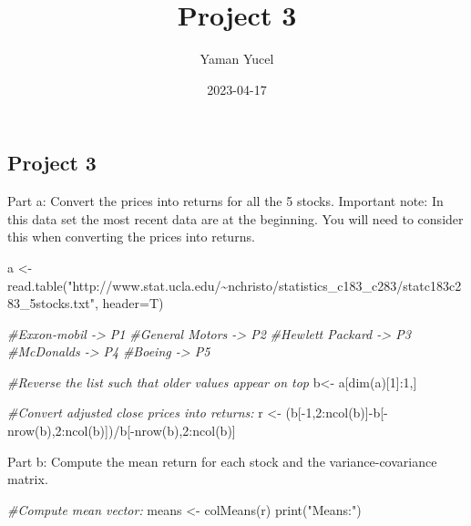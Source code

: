 \documentclass[
]{article}
\title{Project 3}
\author{Yaman Yucel}
\date{2023-04-17}
\newenvironment{Shaded}{\begin{snugshade}}{\end{snugshade}}
\newcommand{\AttributeTok}[1]{\textcolor[rgb]{0.77,0.63,0.00}{#1}}
\newcommand{\CommentTok}[1]{\textcolor[rgb]{0.56,0.35,0.01}{\textit{#1}}}
\newcommand{\DecValTok}[1]{\textcolor[rgb]{0.00,0.00,0.81}{#1}}
\newcommand{\FunctionTok}[1]{\textcolor[rgb]{0.00,0.00,0.00}{#1}}
\newcommand{\NormalTok}[1]{#1}
\newcommand{\OtherTok}[1]{\textcolor[rgb]{0.56,0.35,0.01}{#1}}
\newcommand{\SpecialCharTok}[1]{\textcolor[rgb]{0.00,0.00,0.00}{#1}}
\newcommand{\StringTok}[1]{\textcolor[rgb]{0.31,0.60,0.02}{#1}}
\begin{document}
\maketitle

\hypertarget{project-3}{%
\subsection{Project 3}\label{project-3}}

Part a: Convert the prices into returns for all the 5 stocks. Important
note: In this data set the most recent data are at the beginning. You
will need to consider this when converting the prices into returns.

\begin{Shaded}
\begin{Highlighting}[]
\NormalTok{a }\OtherTok{\textless{}{-}} \FunctionTok{read.table}\NormalTok{(}\StringTok{"http://www.stat.ucla.edu/\textasciitilde{}nchristo/statistics\_c183\_c283/statc183c283\_5stocks.txt"}\NormalTok{, }\AttributeTok{header=}\NormalTok{T)}

\CommentTok{\#Exxon{-}mobil {-}\textgreater{} P1}
\CommentTok{\#General Motors {-}\textgreater{} P2}
\CommentTok{\#Hewlett Packard {-}\textgreater{} P3}
\CommentTok{\#McDonalds {-}\textgreater{} P4}
\CommentTok{\#Boeing {-}\textgreater{} P5}


\CommentTok{\#Reverse the list such that older values appear on top}
\NormalTok{b}\OtherTok{\textless{}{-}}\NormalTok{ a[}\FunctionTok{dim}\NormalTok{(a)[}\DecValTok{1}\NormalTok{]}\SpecialCharTok{:}\DecValTok{1}\NormalTok{,]}

\CommentTok{\#Convert adjusted close prices into returns:}
\NormalTok{r }\OtherTok{\textless{}{-}}\NormalTok{ (b[}\SpecialCharTok{{-}}\DecValTok{1}\NormalTok{,}\DecValTok{2}\SpecialCharTok{:}\FunctionTok{ncol}\NormalTok{(b)]}\SpecialCharTok{{-}}\NormalTok{b[}\SpecialCharTok{{-}}\FunctionTok{nrow}\NormalTok{(b),}\DecValTok{2}\SpecialCharTok{:}\FunctionTok{ncol}\NormalTok{(b)])}\SpecialCharTok{/}\NormalTok{b[}\SpecialCharTok{{-}}\FunctionTok{nrow}\NormalTok{(b),}\DecValTok{2}\SpecialCharTok{:}\FunctionTok{ncol}\NormalTok{(b)]}
\end{Highlighting}
\end{Shaded}

Part b: Compute the mean return for each stock and the
variance-covariance matrix.

\begin{Shaded}
\begin{Highlighting}[]
\CommentTok{\#Compute mean vector:}
\NormalTok{means }\OtherTok{\textless{}{-}} \FunctionTok{colMeans}\NormalTok{(r)}
\FunctionTok{print}\NormalTok{(}\StringTok{"Means:"}\NormalTok{)}
\end{Highlighting}
\end{Shaded}
\end{document}
